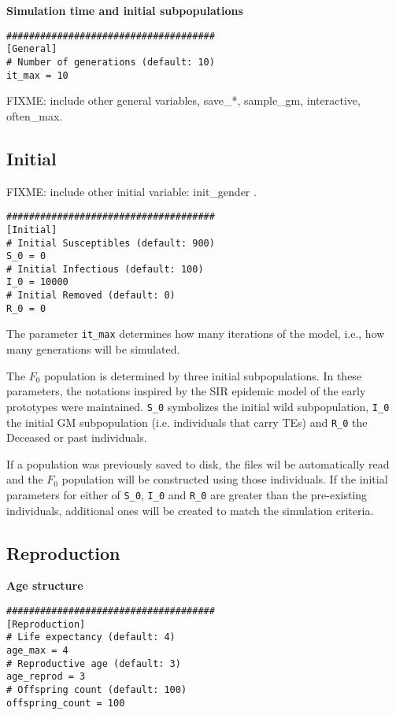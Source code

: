 \documentclass[10pt]{article}
\begin{document}
{\bf Simulation time and initial subpopulations}

\begin{verbatim}
#####################################
[General]
# Number of generations (default: 10)
it_max = 10
\end{verbatim}

FIXME: include other general variables, save\_*, sample\_gm,
interactive, often\_max.

\subsection{Initial}
\label{sec:default_config_initial}

FIXME: include other initial variable: init\_gender .

\begin{verbatim}
#####################################
[Initial]
# Initial Susceptibles (default: 900)
S_0 = 0
# Initial Infectious (default: 100)
I_0 = 10000
# Initial Removed (default: 0)
R_0 = 0
\end{verbatim}

The parameter \verb$it_max$ determines how many iterations of the model,
i.e., how many generations will be simulated.

The $F_0$ population is determined by three initial subpopulations. In
these parameters, the notations inspired by the SIR epidemic model of
the early prototypes were maintained. \verb$S_0$ symbolizes the
initial wild subpopulation, \verb$I_0$ the initial GM subpopulation
(i.e. individuals that carry TEs) and \verb$R_0$ the Deceased or past
individuals.

If a population was previously saved to disk, the files wil be
automatically read and the $F_0$ population will be constructed using
those individuals. If the initial parameters for either of \verb$S_0$,
\verb$I_0$ and \verb$R_0$ are greater than the pre-existing
individuals, additional ones will be created to match the simulation
criteria.


\subsection{Reproduction}
\label{sec:default_config_reproduction}

{\bf Age structure}

\begin{verbatim}
#####################################
[Reproduction]
# Life expectancy (default: 4)
age_max = 4
# Reproductive age (default: 3)
age_reprod = 3
# Offspring count (default: 100)
offspring_count = 100
\end{verbatim}
\end{document}
